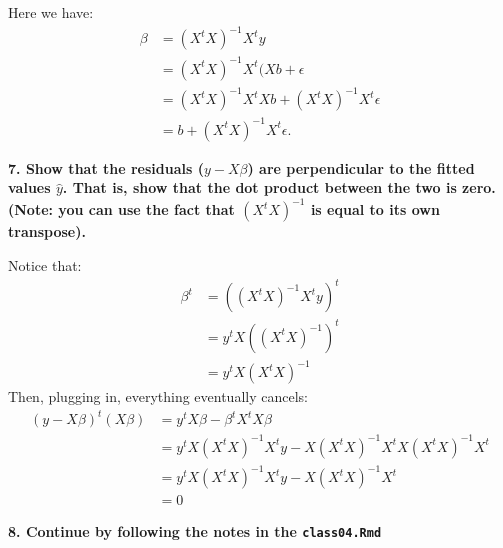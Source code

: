 \documentclass[12pt,hidelinks]{article}
\numberwithin{equation}{section}
\begin{document}
\vspace*{12pt}

Here we have:
\begin{align}
\beta &= (X^t X)^{-1} X^t y \\
&= (X^t X)^{-1} X^t (X b + \epsilon \\
&= (X^t X)^{-1} X^t X b + (X^t X)^{-1} X^t \epsilon \\
&= b + (X^t X)^{-1} X^t \epsilon.
\end{align}

\vspace*{12pt}

\textbf{7. Show that the residuals ($y - X\beta$) are perpendicular to the fitted
values $\widehat{y}$. That is, show that the dot product between the two is
zero. (Note: you can use the fact that $(X^tX)^{-1}$ is equal to its own transpose).}

\vspace*{12pt}

Notice that:
\begin{align}
\beta^t &= \left( (X^t X)^{-1} X^t y \right)^t \\
&= y^t X ((X^t X)^{-1})^t \\
&= y^t X (X^t X)^{-1}
\end{align}
Then, plugging in, everything eventually cancels:
\begin{align}
(y - X \beta)^t (X \beta) &= y^t X \beta - \beta^t X^t X \beta \\
&= y^t X (X^t X)^{-1} X^t y - X (X^t X)^{-1} X^t X (X^t X)^{-1} X^t \\
&= y^t X (X^t X)^{-1} X^t y - X (X^t X)^{-1} X^t \\
&= 0
\end{align}

\vspace*{12pt}

\textbf{8. Continue by following the notes in the \texttt{class04.Rmd}}

\vspace*{12pt}
\end{document}
